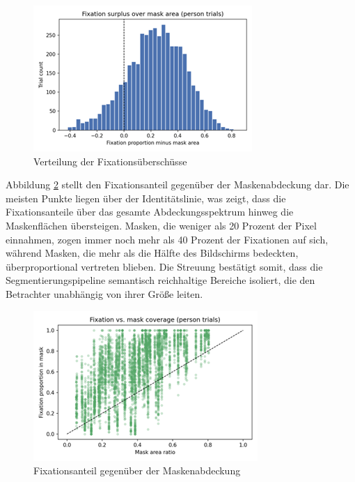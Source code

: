 \documentclass[
    language=german, %
    thesis=seminar, %
    supervisor=postdoc, %
    multiauthor=true, %
    ]{settings/csssa-thesis}
\begin{document}
\begin{figure}[h]
    \centering
    \includegraphics[width=\linewidth,height=0.8\textheight,keepaspectratio]{figures/Bild26.png}
    \caption{Verteilung der Fixationsüberschüsse }\label{fig:bild21}
\end{figure}

Abbildung \ref{fig:bild22} stellt den Fixationsanteil gegenüber der Maskenabdeckung dar. Die meisten Punkte liegen über der Identitätslinie, 
was zeigt, dass die Fixationsanteile über das gesamte Abdeckungsspektrum hinweg die Maskenflächen übersteigen. Masken, 
die weniger als 20 Prozent der Pixel einnahmen, zogen immer noch mehr als 40 Prozent der Fixationen auf sich, während Masken, 
die mehr als die Hälfte des Bildschirms bedeckten, überproportional vertreten blieben. Die Streuung bestätigt somit, 
dass die Segmentierungspipeline semantisch reichhaltige Bereiche isoliert, die den Betrachter unabhängig von ihrer Größe leiten.

\begin{figure}[h]
    \centering
    \includegraphics[width=\linewidth,height=0.8\textheight,keepaspectratio]{figures/Bild27.png}
    \caption{Fixationsanteil gegenüber der Maskenabdeckung}\label{fig:bild22}
\end{figure}
\end{document}
